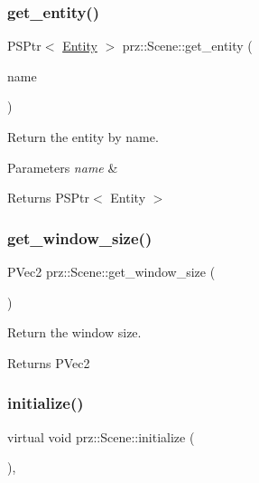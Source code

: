 \subsubsection{\texorpdfstring{get\_entity()}{get\_entity()}}
{\footnotesize\ttfamily P\+S\+Ptr$<$ \mbox{\hyperlink{classprz_1_1_entity}{Entity}} $>$ prz\+::\+Scene\+::get\+\_\+entity (\begin{DoxyParamCaption}\item[{const P\+String \&}]{name }\end{DoxyParamCaption})\hspace{0.3cm}{\ttfamily [inline]}}



Return the entity by name. 


\begin{DoxyParams}{Parameters}
{\em name} & \\
\hline
\end{DoxyParams}
\begin{DoxyReturn}{Returns}
P\+S\+Ptr$<$ Entity $>$ 
\end{DoxyReturn}
\mbox{\label{classprz_1_1_scene_a1740ae76f69941fd144c0bd2b676cbee}} 
\subsubsection{\texorpdfstring{get\_window\_size()}{get\_window\_size()}}
{\footnotesize\ttfamily P\+Vec2 prz\+::\+Scene\+::get\+\_\+window\+\_\+size (\begin{DoxyParamCaption}{ }\end{DoxyParamCaption})\hspace{0.3cm}{\ttfamily [inline]}}



Return the window size. 

\begin{DoxyReturn}{Returns}
P\+Vec2 
\end{DoxyReturn}
\mbox{\label{classprz_1_1_scene_ad8ae9e750f1d233f7026cba59241f419}} 
\subsubsection{\texorpdfstring{initialize()}{initialize()}}
{\footnotesize\ttfamily virtual void prz\+::\+Scene\+::initialize (\begin{DoxyParamCaption}{ }\end{DoxyParamCaption})\hspace{0.3cm}{\ttfamily [inline]}, {\ttfamily [virtual]}}



